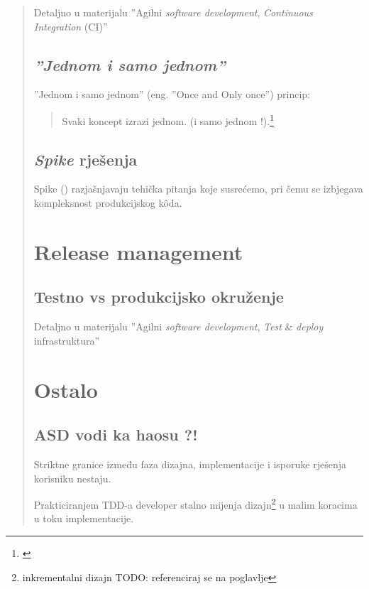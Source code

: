 \documentclass[lmodern, utf8, zavrsni]{fit}
\begin{document}
\begin{quote}
Detaljno u materijalu ''Agilni \emph{software development}, \emph{Continuous Integration} (CI)''\citep{agileci}

\section{\emph{''Jednom i samo jednom''}}

''Jednom i samo jednom'' (eng. ''Once and Only once'') princip:

\begin{quotation}
  Svaki koncept izrazi jednom. (i samo jednom !).\footnote{\citep[str. 319]{agileart}}
\end{quotation}

\section{\emph{Spike} rješenja}

Spike (\href{http://translate.google.com/#en/hr/spike}{\color{blue}{bos. ekser, smeč}}) razjašnjavaju tehička pitanja koje susrećemo, pri čemu se izbjegava kompleksnost produkcijskog k\^oda.\citep[str. 334]{agileart}

\chapter{Release management}

\section{Testno vs produkcijsko okruženje}

Detaljno u materijalu ''Agilni \emph{software development}, \emph{Test} \& \emph{deploy} infrastruktura''\citep{agiletestdeploy}

\chapter{Ostalo}

\section{ASD vodi ka haosu ?!}

Striktne granice između faza dizajna, implementacije i isporuke rješenja korisniku nestaju.

Prakticiranjem TDD-a developer stalno mijenja dizajn\footnote{inkrementalni dizajn TODO: referenciraj se na poglavlje} u malim koracima u toku implementacije.


\end{quote}
\end{document}
